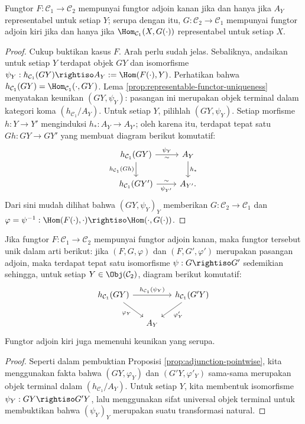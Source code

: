 \begin{proposition}\label{prop:adjunction-pointwise}
	Fungtor $F: \mathcal{C}_1 \to \mathcal{C}_2$ mempunyai fungtor adjoin kanan jika dan hanya jika $A_Y$ representabel untuk setiap $Y$; serupa dengan itu, $G: \mathcal{C}_2 \to \mathcal{C}_1$ mempunyai fungtor adjoin kiri jika dan hanya jika $\Hom_{\mathcal{C}_1}(X, G(\cdot))$ representabel untuk setiap $X$.
\end{proposition}
\begin{proof}
	Cukup buktikan kasus $F$. Arah perlu sudah jelas. Sebaliknya, andaikan untuk setiap $Y$ terdapat objek $GY$ dan isomorfisme $\psi_Y: h_{\mathcal{C}_1}(GY) \rightiso A_Y := \Hom(F(\cdot), Y)$. Perhatikan bahwa $h_{\mathcal{C}_1}(GY) = \Hom_{\mathcal{C}_1}(\cdot, GY)$. Lema \ref{prop:representable-functor-uniqueness} menyatakan keunikan $(GY, \psi_Y)$: pasangan ini merupakan objek terminal dalam kategori koma $(h_{\mathcal{C}_1} / A_Y)$. Untuk setiap $Y$, pilihlah $(GY, \psi_Y)$. Setiap morfisme $h: Y \to Y'$ menginduksi $h_*: A_Y \to A_{Y'}$; oleh karena itu, terdapat tepat satu $Gh: GY \to GY'$ yang membuat diagram berikut komutatif:
	\[ \begin{tikzcd}
		h_{\mathcal{C}_1}(GY) \arrow[d, "{h_{\mathcal{C}_1}(Gh)}"'] \arrow[r, "\psi_Y", "\sim"'] & A_Y \arrow[d, "h_*"] \\
		h_{\mathcal{C}_1}(GY') \arrow[r, "{\psi_{Y'}}"', "\sim"] & A_{Y'} .
	\end{tikzcd} \]
	Dari sini mudah dilihat bahwa $(GY, \psi_Y)_Y$ memberikan $G: \mathcal{C}_2 \to \mathcal{C}_1$ dan $\varphi = \psi^{-1}: \Hom(F(\cdot), \cdot) \rightiso \Hom(\cdot, G(\cdot))$.
\end{proof}

\begin{proposition}\label{prop:adjunction-uniqueness}
	Jika fungtor $F: \mathcal{C}_1 \to \mathcal{C}_2$ mempunyai fungtor adjoin kanan, maka fungtor tersebut unik dalam arti berikut: jika $(F, G, \varphi)$ dan $(F, G', \varphi')$ merupakan pasangan adjoin, maka terdapat tepat satu isomorfisme $\psi: G \rightiso G'$ sedemikian sehingga, untuk setiap $Y \in \Obj(\mathcal{C}_2)$, diagram berikut komutatif:
	\[ \begin{tikzcd}[column sep=small]
		h_{\mathcal{C}_1}(GY) \arrow[rr, "{h_{\mathcal{C}_1}(\psi_Y)}"] \arrow[rd, "\varphi_Y"'] & & h_{\mathcal{C}_1}(G'Y) \arrow[ld, "{{\varphi}'_Y}"] \\
		& A_Y &
	\end{tikzcd} \]
	Fungtor adjoin kiri juga memenuhi keunikan yang serupa.
\end{proposition}
\begin{proof}
	Seperti dalam pembuktian Proposisi \ref{prop:adjunction-pointwise}, kita menggunakan fakta bahwa $(GY, \varphi_Y)$ dan $(G'Y, {\varphi}'_Y)$ sama-sama merupakan objek terminal dalam $(h_{\mathcal{C}_1} / A_Y)$. Untuk setiap $Y$, kita membentuk isomorfisme $\psi_Y: GY \rightiso G'Y$, lalu menggunakan sifat universal objek terminal untuk membuktikan bahwa $(\psi_Y)_Y$ merupakan suatu transformasi natural.
\end{proof}

